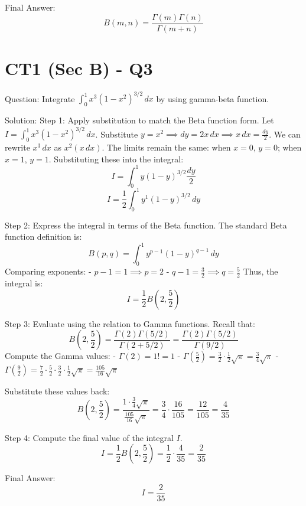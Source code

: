 \documentclass{article}
\begin{document}
Final Answer:
\[
\boxed{B(m, n) = \frac{\Gamma(m)\Gamma(n)}{\Gamma(m+n)}}
\]

\section*{CT1 (Sec B) - Q3}
Question:
Integrate $\int_0^1 x^3 (1-x^2)^{3/2} \, dx$ by using gamma-beta function.

Solution:
Step 1: Apply substitution to match the Beta function form.
Let $I = \int_0^1 x^3 (1 - x^2)^{3/2} \, dx$.
Substitute $y = x^2 \implies dy = 2x \, dx \implies x \, dx = \frac{dy}{2}$.
We can rewrite $x^3 \, dx$ as $x^2(x \, dx)$.
The limits remain the same: when $x = 0$, $y = 0$; when $x = 1$, $y = 1$.
Substituting these into the integral:
\[
I = \int_0^1 y (1-y)^{3/2} \frac{dy}{2}
\]
\[
I = \frac{1}{2} \int_0^1 y^1 (1-y)^{3/2} \, dy
\]

Step 2: Express the integral in terms of the Beta function.
The standard Beta function definition is:
\[
B(p, q) = \int_0^1 y^{p-1} (1-y)^{q-1} \, dy
\]
Comparing exponents:
- $p - 1 = 1 \implies p = 2$
- $q - 1 = \frac{3}{2} \implies q = \frac{5}{2}$
Thus, the integral is:
\[
I = \frac{1}{2} B\left(2, \frac{5}{2}\right)
\]

Step 3: Evaluate using the relation to Gamma functions.
Recall that:
\[
B\left(2, \frac{5}{2}\right) = \frac{\Gamma(2)\Gamma(5/2)}{\Gamma(2+5/2)} = \frac{\Gamma(2)\Gamma(5/2)}{\Gamma(9/2)}
\]
Compute the Gamma values:
- $\Gamma(2) = 1! = 1$
- $\Gamma\left(\frac{5}{2}\right) = \frac{3}{2} \cdot \frac{1}{2} \sqrt{\pi} = \frac{3}{4}\sqrt{\pi}$
- $\Gamma\left(\frac{9}{2}\right) = \frac{7}{2} \cdot \frac{5}{2} \cdot \frac{3}{2} \cdot \frac{1}{2} \sqrt{\pi} = \frac{105}{16}\sqrt{\pi}$

Substitute these values back:
\[
B\left(2, \frac{5}{2}\right) = \frac{1 \cdot \frac{3}{4}\sqrt{\pi}}{\frac{105}{16}\sqrt{\pi}} = \frac{3}{4} \cdot \frac{16}{105} = \frac{12}{105} = \frac{4}{35}
\]

Step 4: Compute the final value of the integral $I$.
\[
I = \frac{1}{2} B\left(2, \frac{5}{2}\right) = \frac{1}{2} \cdot \frac{4}{35} = \frac{2}{35}
\]

Final Answer:
\[
\boxed{I = \frac{2}{35}}
\]
\end{document}
